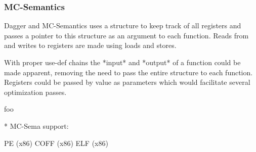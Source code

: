 
\subsubsection{MC-Semantics}

Dagger and MC-Semantics uses a structure to keep track of all registers and passes a pointer to this structure as an argument to each function. Reads from and writes to registers are made using loads and stores.

With proper use-def chains the *input* and *output* of a function could be made apparent, removing the need to pass the entire structure to each function. Registers could be passed by value as parameters which would facilitate several optimization passes.





foo \cite{mcsema}

* MC-Sema support:

PE (x86)
COFF (x86)
ELF (x86)
